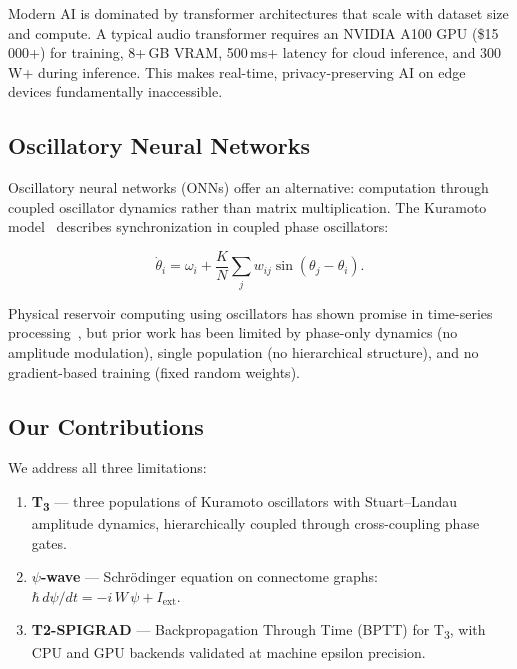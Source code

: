 \documentclass[twocolumn,10pt]{article}
\newcommand{\Tthree}{T\textsubscript{3}}
\newcommand{\psiwave}{$\psi$-wave}
\begin{document}
Modern AI is dominated by transformer architectures that scale with dataset size and compute. A typical audio transformer requires an NVIDIA A100 GPU (\$15\,000+) for training, 8+\,GB VRAM, 500\,ms+ latency for cloud inference, and 300\,W+ during inference. This makes real-time, privacy-preserving AI on edge devices fundamentally inaccessible.

\subsection{Oscillatory Neural Networks}

Oscillatory neural networks (ONNs) offer an alternative: computation through coupled oscillator dynamics rather than matrix multiplication. The Kuramoto model~\cite{kuramoto1975} describes synchronization in coupled phase oscillators:

\begin{equation}\label{eq:kuramoto}
\dot{\theta}_i = \omega_i + \frac{K}{N}\sum_{j} w_{ij} \sin(\theta_j - \theta_i).
\end{equation}

Physical reservoir computing using oscillators has shown promise in time-series processing~\cite{nakajima2019,jaeger2001}, but prior work has been limited by phase-only dynamics (no amplitude modulation), single population (no hierarchical structure), and no gradient-based training (fixed random weights).

\subsection{Our Contributions}

We address all three limitations:

\begin{enumerate}
  \item \textbf{\Tthree{}} --- three populations of Kuramoto oscillators with Stuart--Landau amplitude dynamics, hierarchically coupled through cross-coupling phase gates.
  \item \textbf{\psiwave{}} --- Schr\"odinger equation on connectome graphs: $\hbar\,d\psi/dt = -i\,W\,\psi + I_{\text{ext}}$.
  \item \textbf{T2-SPIGRAD} --- Backpropagation Through Time (BPTT) for \Tthree{}, with CPU and GPU backends validated at machine epsilon precision.
\end{enumerate}

\end{document}
